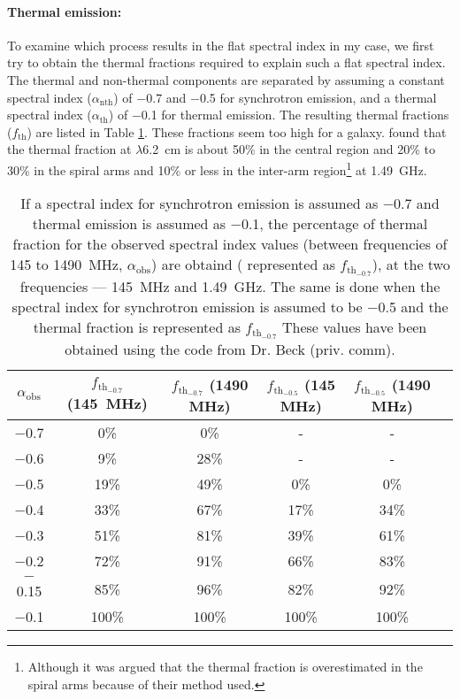 \documentclass[../main/thesis_msc.tex]{subfiles}
\begin{document}
\paragraph{Thermal emission:} To examine which process results in the flat spectral index in my case, we first try to obtain the thermal fractions required to explain such a flat spectral index. The thermal and non-thermal components are separated by assuming a constant spectral index ($\alpha_{\textrm{nth}}$) of $-$0.7 and $-$0.5 for synchrotron emission, and a thermal spectral index ($\alpha_{\textrm{th}}$) of $-$0.1 for thermal emission. The resulting thermal fractions ($f_{\textrm{th}}$) are listed in Table \ref{allph}. These fractions seem too high for a galaxy. \citet{2015A&A...578A..93B} found that the thermal fraction at $\lambda$6.2~cm is about 50\% in the central region and 20\% to 30\% in the spiral arms and 10\% or less in the inter-arm region\footnote{Although it was argued that the thermal fraction is overestimated in the spiral arms because of their method used.} at 1.49~GHz.\\

\begin{table}
\centering         
        \begin{tabular}{cccccc}
        \hline\hline  
             $\alpha_{\textrm{obs}}$ & $f_{\textrm{th}_{-0.7}}$ (145~MHz) & $f_{\textrm{th}_{-0.7}}$ (1490 MHz) & $f_{\textrm{th}_{-0.5}}$ (145 MHz) & $f_{\textrm{th}_{-0.5}}$ (1490 MHz)\\
            \hline
            $-$0.7 & 0\% & 0\% &-&-\\
			$-$0.6 & 9\% & 28\% &-&-\\
			$-$0.5 & 19\% & 49\% &0\% & 0\%\\
			$-$0.4 & 33\% & 67\% & 17\% & 34\%\\
			$-$0.3 & 51\% & 81\% & 39\% &61\%\\
			$-$0.2 & 72\% & 91\% & 66\% & 83\%\\
			$-$0.15 & 85\% & 96\%& 82\% & 92\%  \\
			$-$0.1 & 100\% & 100\% & 100\%& 100\%\\
            \hline
        \end{tabular}
\caption{If a spectral index for synchrotron emission is assumed as $-$0.7 and thermal emission is assumed as $-$0.1, the percentage of thermal fraction for the observed spectral index values (between frequencies of 145 to 1490~MHz, $\alpha_{\textrm{obs}}$) are obtaind ( represented as $f_{\textrm{th}_{-0.7}}$), at the two frequencies --- 145~MHz and 1.49~GHz. The same is done when the spectral index for synchrotron emission is assumed to be $-$0.5 and the thermal fraction is represented as $f_{\textrm{th}_{-0.7}}$ These values have been obtained using the code from Dr. Beck (priv. comm).}
\label{allph}  
\end{table}
\end{document}
